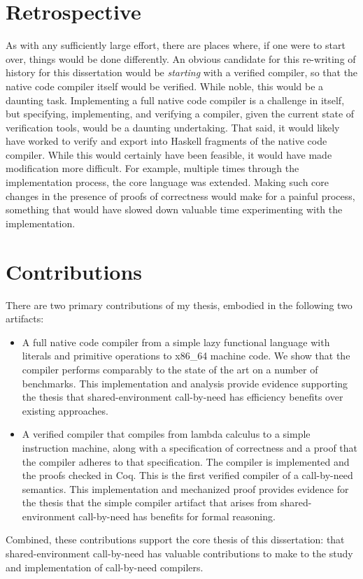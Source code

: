 \section{Retrospective}

As with any sufficiently large effort, there are places where, if one were to
start over, things would be done differently. An obvious candidate for this
re-writing of history for this dissertation would be \emph{starting} with a
verified compiler, so that the native code compiler itself would be verified.
While noble, this would be a daunting task. Implementing a full native code
compiler is a challenge in itself, but specifying, implementing, and verifying a
compiler, given the current state of verification tools, would be a daunting
undertaking. That said, it would likely have worked to verify and export into
Haskell fragments of the native code compiler. While this would certainly have
been feasible, it would have made modification more difficult. For example,
multiple times through the implementation process, the core language was
extended. Making such core changes in the presence of proofs of correctness
would make for a painful process, something that would have slowed down valuable
time experimenting with the implementation.

\section{Contributions}

There are two primary contributions of my thesis, embodied in the following two
artifacts:

\begin{itemize}
\item A full native code compiler from a simple lazy functional language with
literals and primitive operations to x86\_64 machine code. We show that the
compiler performs comparably to the state of the art on a number of benchmarks.
This implementation and analysis provide evidence supporting the thesis that
shared-environment call-by-need has efficiency benefits over existing
approaches.

\item A verified compiler that compiles from lambda calculus to a simple
instruction machine, along with a specification of correctness and a proof that
the compiler adheres to that specification. The compiler is implemented and the
proofs checked in Coq. This is the first verified compiler of a call-by-need
semantics. This implementation and mechanized proof provides evidence for the
thesis that the simple compiler artifact that arises from shared-environment
call-by-need has benefits for formal reasoning.
\end{itemize}

Combined, these contributions support the core thesis of this dissertation: that
shared-environment call-by-need has valuable contributions to make to the study
and implementation of call-by-need compilers.
